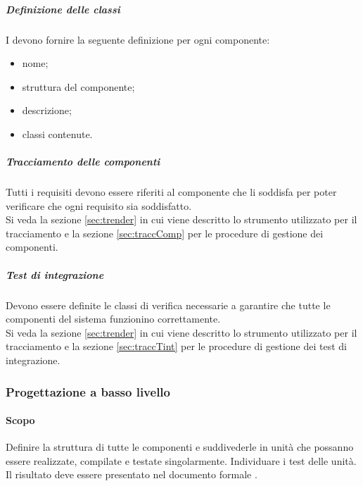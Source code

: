 				\subparagraph{Definizione delle classi}
				I \progettisti{} devono fornire la seguente definizione per ogni componente:
				\begin{itemize}
					\item nome;
					\item struttura del componente;
					\item descrizione;
					\item classi contenute.
				\end{itemize}
                \subparagraph{Tracciamento delle componenti}
                Tutti i requisiti devono essere riferiti al componente che li soddisfa per poter verificare che ogni requisito sia soddisfatto.  \\
                Si veda la sezione \ref{sec:trender} in cui viene descritto lo strumento utilizzato per il tracciamento e la sezione \ref{sec:traccComp} per le procedure di gestione dei componenti.
                \subparagraph{Test di integrazione}\label{sec:testInt}
                Devono essere definite le classi di verifica necessarie a garantire che tutte le componenti del sistema funzionino correttamente. \\
                Si veda la sezione \ref{sec:trender} in cui viene descritto lo strumento utilizzato per il tracciamento e la sezione \ref{sec:traccTint} per le procedure di gestione dei test di integrazione.
                
            \subsubsection{Progettazione a basso livello}
                \paragraph{Scopo}
                Definire la struttura di tutte le componenti e suddivederle in unità che possanno essere realizzate, compilate e testate singolarmente. Individuare i test delle unità. Il risultato deve essere presentato nel documento formale \ddp.

